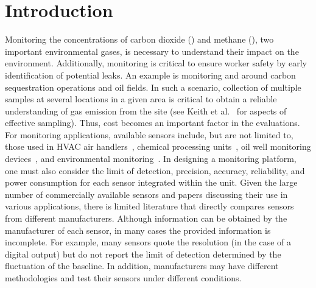 \documentclass[sensors,article,submit,moreauthors,pdftex]{Definitions/mdpi}
\begin{document}
	
	\section{Introduction}
	\label{sec:intro}
		
		Monitoring the concentrations of carbon dioxide () and methane (), two important environmental gases, is necessary to understand their impact on the environment.
		Additionally, monitoring is critical to ensure worker safety by early identification of potential leaks.
		An example is monitoring  and  around carbon sequestration operations and oil fields.
		In such a scenario, collection of multiple samples at several locations in a given area is critical to obtain a reliable understanding of gas emission from the site (see Keith et al.~\cite{keith_principles_1983} for aspects of effective sampling).
		Thus, cost becomes an important factor in the evaluations.
		For monitoring applications, available sensors include, but are not limited to, those used in HVAC air handlers~\cite{yang_systematic_2014,chung_selective_2008}, chemical processing units~\cite{won_nonlinear_2012}, oil well monitoring devices~\cite{yi_remote_2010,somov_deployment_2013}, and environmental monitoring~\cite{pering_high_2014,black_formation_2012,guohua_study_2012,karunanithi_performance_2009,shendell_outdoor_2012}.
		In designing a monitoring platform, one must also consider the limit of detection, precision, accuracy, reliability, and power consumption for each sensor integrated within the unit.
		Given the large number of commercially available sensors and papers discussing their use in various applications, there is limited literature that directly compares sensors from different manufacturers.
		Although information can be obtained by the manufacturer of each sensor, in many cases the provided information is incomplete.
		For example, many sensors quote the resolution (in the case of a digital output) but do not report the limit of detection determined by the fluctuation of the baseline.
		In addition, manufacturers may have different methodologies and test their sensors under different conditions.
		
\end{document}
